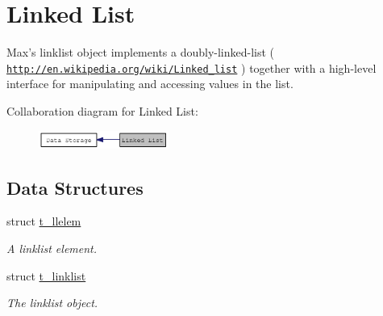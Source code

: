 \hypertarget{group__linklist}{
\section{Linked List}
\label{group__linklist}
}


Max's linklist object implements a doubly-\/linked-\/list ( \href{http://en.wikipedia.org/wiki/Linked_list}{\tt http://en.wikipedia.org/wiki/Linked\_\-list} ) together with a high-\/level interface for manipulating and accessing values in the list.  


Collaboration diagram for Linked List:\nopagebreak
\begin{figure}[H]
\begin{center}
\leavevmode
\includegraphics[width=121pt]{group__linklist}
\end{center}
\end{figure}
\subsection*{Data Structures}
\begin{DoxyCompactItemize}
\item 
struct \hyperlink{structt__llelem}{t\_\-llelem}
\begin{DoxyCompactList}\small\item\em A linklist element. \item\end{DoxyCompactList}\item 
struct \hyperlink{structt__linklist}{t\_\-linklist}
\begin{DoxyCompactList}\small\item\em The linklist object. \item\end{DoxyCompactList}\end{DoxyCompactItemize}
